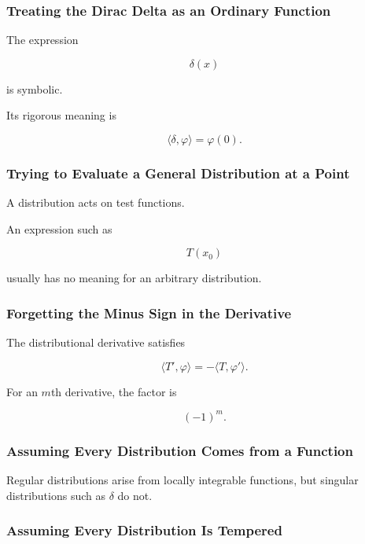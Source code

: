 \subsubsection{Treating the Dirac Delta as an Ordinary Function}

The expression

\[
\delta(x)
\]

is symbolic.

Its rigorous meaning is

\[
\boxed{
\langle\delta,\varphi\rangle
=
\varphi(0).
}
\]

\subsubsection{Trying to Evaluate a General Distribution at a Point}

A distribution acts on test functions.

An expression such as

\[
T(x_0)
\]

usually has no meaning for an arbitrary distribution.

\subsubsection{Forgetting the Minus Sign in the Derivative}

The distributional derivative satisfies

\[
\boxed{
\langle T',\varphi\rangle
=
-\langle T,\varphi'\rangle.
}
\]

For an \(m\)th derivative, the factor is

\[
\boxed{
(-1)^m.
}
\]

\subsubsection{Assuming Every Distribution Comes from a Function}

Regular distributions arise from locally integrable functions, but
singular distributions such as \(\delta\) do not.

\subsubsection{Assuming Every Distribution Is Tempered}

